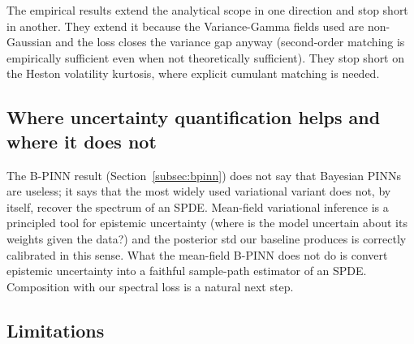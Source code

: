 \documentclass[10pt]{elsarticle}
\begin{document}
The empirical results extend the analytical scope in one direction
and stop short in another. They extend it because the
Variance-Gamma fields used are non-Gaussian and the loss closes
the variance gap anyway (second-order matching is empirically
sufficient even when not theoretically sufficient). They stop
short on the Heston volatility kurtosis, where explicit cumulant
matching is needed.

\subsection{Where uncertainty quantification helps and where it does not}

The B-PINN result (Section~\ref{subsec:bpinn}) does not say that
Bayesian PINNs are useless; it says that the most widely used
variational variant does not, by itself, recover the spectrum of
an SPDE. Mean-field variational inference is a principled tool for
epistemic uncertainty (where is the model uncertain about its
weights given the data?) and the posterior std our baseline
produces is correctly calibrated in this sense. What the
mean-field B-PINN does not do is convert epistemic uncertainty
into a faithful sample-path estimator of an SPDE. Composition with
our spectral loss is a natural next step.

\subsection{Limitations}
\end{document}
